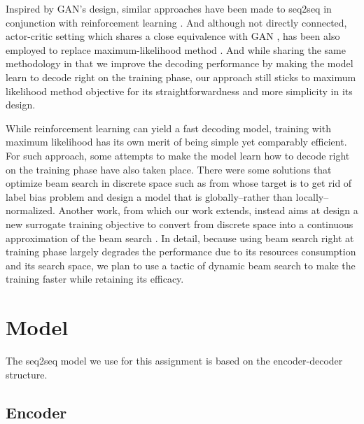 \documentclass[11pt,a4paper]{article}
\begin{document}
Inspired by GAN's design, similar approaches have been made to seq2seq in conjunction with reinforcement learning \cite{kusner2016gans, yu2017seqgan,gu2017neural, gumbel2017}. And although not directly connected, actor-critic setting which shares a close equivalence with GAN \cite{pfau2016connecting}, has been also employed to replace maximum-likelihood method \cite{bahdanau2017actor}. And while sharing the same methodology in that we improve the decoding performance by making the model learn to decode right on the training phase, our approach still sticks to maximum likelihood method objective for its straightforwardness and more simplicity in its design.  

While reinforcement learning can yield a fast decoding model, training with maximum likelihood has its own merit of being simple yet comparably efficient. For such approach, some attempts to make the model learn how to decode right on the training phase have also taken place. There were some solutions that optimize beam search in discrete space such as from \citet{wiseman2016sequence, andor2016globally} whose target is to get rid of label bias problem and design a model that is globally--rather than locally--normalized. Another work, from which our work extends, instead aims at design a new surrogate training objective to convert from discrete space into a continuous approximation of the beam search \cite{goyal2018continuous}. In detail, because using beam search right at training phase largely degrades the performance due to its resources consumption and its search space, we plan to use a tactic of dynamic beam search \cite{buckman2016transition} to make the training faster while retaining its efficacy. 


\section{Model}

The seq2seq model we use for this assignment is based on the encoder-decoder structure.



\subsection{Encoder}
\end{document}
